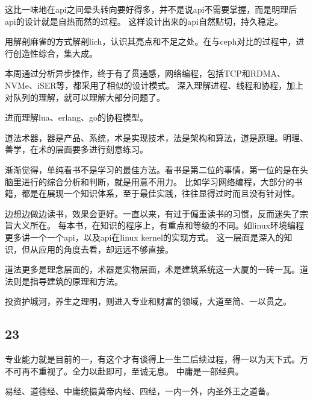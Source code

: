 这比一味地在api之间晕头转向要好得多，并不是说api不需要掌握，而是明理后api的设计就是自热而然的过程。
这样设计出来的api自然贴切，持久稳定。

用解剖麻雀的方式解剖lich，认识其亮点和不足之处。在与ceph对比的过程中，进行创造性综合，集大成。

本周通过分析异步操作，终于有了贯通感，网络编程，包括TCP和RDMA、NVMe、iSER等，都采用了相似的设计模式。
深入理解进程、线程和协程，加上对队列的理解，就可以理解大部分问题了。

进而理解lua、erlang、go的协程模型。

道法术器，器是产品、系统，术是实现技术，法是架构和算法，道是原理。明理、善学，在术的层面要多进行刻意练习。

渐渐觉得，单纯看书不是学习的最佳方法。看书是第二位的事情，第一位的是在头脑里进行的综合分析和判断，就是用意不用力。
比如学习网络编程，大部分的书籍，都是在展现一个知识体系，至于最佳实践，往往显得过时而且没有针对性。

边想边做边读书，效果会更好。一直以来，有过于偏重读书的习惯，反而迷失了宗旨大义所在。
每本书，在知识的程序上，有重点和等级的不同。如linux环境编程更多讲一个一个api，以及api在linux kernel的实现方式。
这一层面是深入的知识，但从应用的角度去看，却远远不够直接。

道法更多是理念层面的，术器是实物层面，术是建筑系统这一大厦的一砖一瓦。道法则是指导建筑的原理和方法。

投资护城河，养生之理明，则进入专业和财富的领域，大道至简、一以贯之。

\subsection{23}

专业能力就是目前的一，有这个才有谈得上一生二后续过程，得一以为天下式。万不可再不重视了。全力以赴即可，至诚无息。
中庸是一部经典。

易经、道德经、中庸统摄黄帝内经、四经，一内一外，内圣外王之道备。
